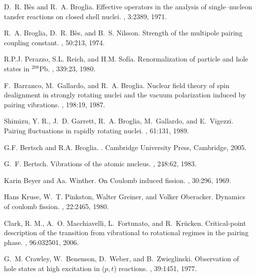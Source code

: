 \documentclass[a4paper,11pt]{article}
\numberwithin{equation}{section}
\numberwithin{figure}{section}
\numberwithin{table}{section}
\begin{document}
\begin{thebibliography}{10}
	D.~R. B{\`{e}}s and R.~A. Broglia.
	\newblock Effective operators in the analysis of single--nucleon tansfer
	reactions on closed shell nuclei.
	, 3:2389, 1971.
	
	R.~A. Broglia, D.~R. B{\`{e}}s, and B.~S. Nilsson.
	\newblock Strength of the multipole pairing coupling constant.
	, 50:213, 1974.
	
	R.P.J. Perazzo, S.L. Reich, and H.M. Sofía.
	\newblock Renormalization of particle and hole states in {$^{208}$}{Pb}.
	, 339:23, 1980.
	
	F.~Barranco, M.~Gallardo, and R.~A. Broglia.
	\newblock Nuclear field theory of spin dealignment in strongly rotating nuclei
	and the vacuum polarization induced by pairing vibrations.
	, 198:19, 1987.
	
	{Shimizu, Y. R.}, J.~D. Garrett, R.~A. Broglia, M.~Gallardo, and E.~Vigezzi.
	\newblock Pairing fluctuations in rapidly rotating nuclei.
	, 61:131, 1989.
	
	G.F. Bertsch and R.A. Broglia.
	.
	\newblock Cambridge University Press, Cambridge, 2005.
	
	G.~F. Bertsch.
	\newblock Vibrations of the atomic nucleus.
	, 248:62, 1983.
	
	Karin Beyer and Aa. Winther.
	\newblock On {Coulomb} induced fission.
	, 30:296, 1969.
	
	Hans Kruse, W.~T. Pinkston, Walter Greiner, and Volker Oberacker.
	\newblock Dynamics of coulomb fission.
	, 22:2465, 1980.
	
	{Clark, R. M.}, A.~O. Macchiavelli, L.~Fortunato, and R.~Kr\"ucken.
	\newblock Critical-point description of the transition from vibrational to
	rotational regimes in the pairing phase.
	, 96:032501, 2006.
	
	G.~M. Crawley, W.~Benenson, D.~Weber, and B.~Zwieglinski.
	\newblock Observation of hole states at high excitation in ($p, t$) reactions.
	, 39:1451, 1977.
	

\end{thebibliography}
\end{document}
